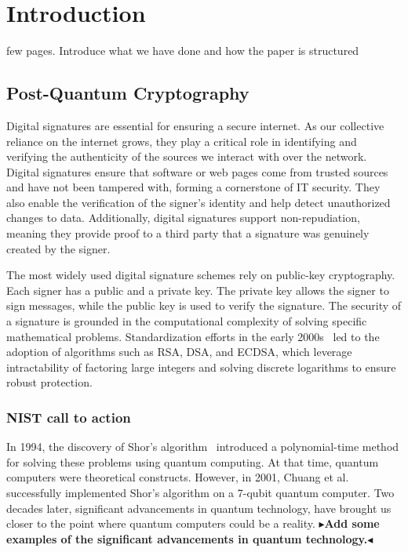 \documentclass[twoside,11pt]{report}
\theoremstyle{definition}
\theoremstyle{plain}
\newcommand{\todo}[1]{{\color[rgb]{.5,0,0}\textbf{$\blacktriangleright$#1$\blacktriangleleft$}}}
\begin{document}
\tableofcontents
\cleardoublepage
{}
\setcounter{secnumdepth}{2}


\chapter{Introduction}\label{ch:intro}

few pages. Introduce what we have done and how the paper is structured

\section{Post-Quantum Cryptography}\label{sec:quantum}

Digital signatures are essential for ensuring a secure internet. As our collective reliance on the internet grows, they play a critical role in identifying and verifying the authenticity of the sources we interact with over the network. Digital signatures ensure that software or web pages come from trusted sources and have not been tampered with, forming a cornerstone of IT security. They also enable the verification of the signer's identity and help detect unauthorized changes to data. Additionally, digital signatures support non-repudiation, meaning they provide proof to a third party that a signature was genuinely created by the signer.

The most widely used digital signature schemes rely on public-key cryptography. Each signer has a public and a private key. The private key allows the signer to sign messages, while the public key is used to verify the signature. The security of a signature is grounded in the computational complexity of solving specific mathematical problems. Standardization efforts in the early 2000s~\cite{pub2000digital} led to the adoption of algorithms such as RSA, DSA, and ECDSA, which leverage intractability of factoring large integers and solving discrete logarithms to ensure robust protection.

\subsection{NIST call to action}

In 1994, the discovery of Shor's algorithm~\cite{shor1997} introduced a polynomial-time method for solving these problems using quantum computing. At that time, quantum computers were theoretical constructs. However, in 2001, Chuang et al.~\cite{vandersypen2001experimental,buchmann2004post} successfully implemented Shor's algorithm on a 7-qubit quantum computer. Two decades later, significant advancements in quantum technology, have brought us closer to the point where quantum computers could be a reality.
\todo{Add some examples of the significant advancements in quantum technology.}
\end{document}
